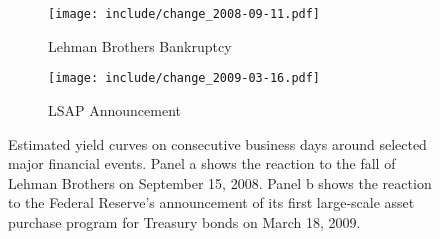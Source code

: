 \documentclass[12pt]{article}
\begin{document}
\begin{figure}[htb] \centering
    \begin{subfigure}[t]{.49\linewidth}
        \texttt{[image: include/change\_2008-09-11.pdf]}
        \caption{Lehman Brothers Bankruptcy}
    \end{subfigure}
    \begin{subfigure}[t]{.49\linewidth}
        \texttt{[image: include/change\_2009-03-16.pdf]}
        \caption{LSAP Announcement}
    \end{subfigure}
    \caption{Estimated yield curves on consecutive business days around selected major financial events. Panel a shows the reaction to the fall of Lehman Brothers on September 15, 2008. Panel b shows the reaction to the Federal Reserve's announcement of its first large-scale asset purchase program for Treasury bonds on March 18, 2009. }
    \label{fig:comparison_good}
\end{figure}



\vfill
\FloatBarrier


\end{document}
